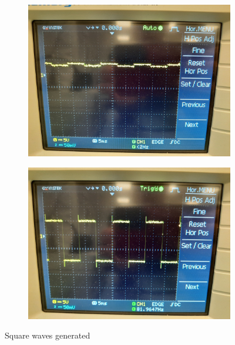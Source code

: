 \documentclass[pdftex,12pt,a4paper]{article}
\begin{document}
\begin{itemize}
\begin{figure}
\begin{subfigure}{0.5\textwidth}
\centering
\includegraphics[width=.95\linewidth]{square_wave_1.jpg}
\end{subfigure}%
\begin{subfigure}{0.5\textwidth}
\centering
\includegraphics[width=.95\linewidth]{square_wave_2.jpg}
\end{subfigure}
\caption{Square waves generated}
\end{figure}   


\end{itemize}
\end{document}
